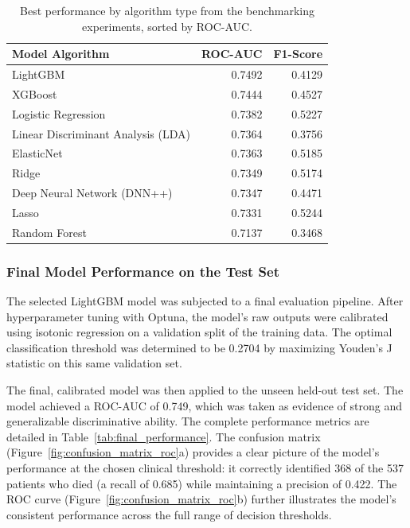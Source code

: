 \begin{table}[htb!]
    \centering
    \caption{Best performance by algorithm type from the benchmarking experiments, sorted by ROC-AUC.}
    \label{tab:ml_benchmark}
    \begin{tabular}{lrr}
        \toprule
        \textbf{Model Algorithm} & \textbf{ROC-AUC} & \textbf{F1-Score} \\
        \midrule
        LightGBM & 0.7492 & 0.4129 \\
        XGBoost & 0.7444 & 0.4527 \\
        Logistic Regression & 0.7382 & 0.5227 \\
        Linear Discriminant Analysis (LDA) & 0.7364 & 0.3756 \\
        ElasticNet & 0.7363 & 0.5185 \\
        Ridge & 0.7349 & 0.5174 \\
        Deep Neural Network (DNN++) & 0.7347 & 0.4471 \\
        Lasso & 0.7331 & 0.5244 \\
        Random Forest & 0.7137 & 0.3468 \\
        \bottomrule
    \end{tabular}
\end{table}

\subsubsection{Final Model Performance on the Test Set}
The selected LightGBM model was subjected to a final evaluation pipeline. After hyperparameter tuning with Optuna, the model's raw outputs were calibrated using isotonic regression on a validation split of the training data. The optimal classification threshold was determined to be 0.2704 by maximizing Youden's J statistic on this same validation set.

The final, calibrated model was then applied to the unseen held-out test set. The model achieved a ROC-AUC of 0.749, which was taken as evidence of strong and generalizable discriminative ability. The complete performance metrics are detailed in Table~\ref{tab:final_performance}. The confusion matrix (Figure~\ref{fig:confusion_matrix_roc}a) provides a clear picture of the model's performance at the chosen clinical threshold: it correctly identified 368 of the 537 patients who died (a recall of 0.685) while maintaining a precision of 0.422. The ROC curve (Figure~\ref{fig:confusion_matrix_roc}b) further illustrates the model's consistent performance across the full range of decision thresholds.

